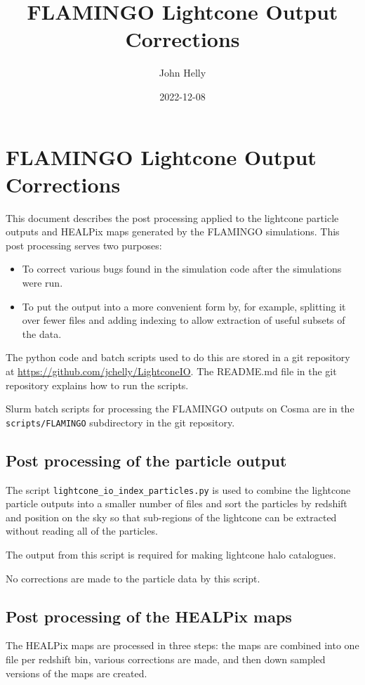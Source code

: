 \documentclass{article}
\title{FLAMINGO Lightcone Output Corrections}
\date{2022-12-08}
\author{John Helly}
\begin{document}
\maketitle

\section{FLAMINGO Lightcone Output Corrections}

This document describes the post processing applied to the lightcone
particle outputs and HEALPix maps generated by the FLAMINGO
simulations. This post processing serves two purposes:
\begin{itemize}
\item{To correct various bugs found in the simulation code after the
    simulations were run.}
\item{To put the output into a more convenient form by, for example,
    splitting it over fewer files and adding indexing to allow
    extraction of useful subsets of the data.}
\end{itemize}
The python code and batch scripts used to do this are stored in a git
repository at \url{https://github.com/jchelly/LightconeIO}. The
README.md file in the git repository explains how to run the scripts.

Slurm batch scripts for processing the FLAMINGO outputs on Cosma are
in the \verb|scripts/FLAMINGO| subdirectory in the git repository.

\subsection{Post processing of the particle output}

The script \verb|lightcone_io_index_particles.py| is used to combine the
lightcone particle outputs into a smaller number of files and sort the
particles by redshift and position on the sky so that sub-regions of
the lightcone can be extracted without reading all of the particles.

The output from this script is required for making lightcone halo
catalogues.

No corrections are made to the particle data by this script.

\subsection{Post processing of the HEALPix maps}

The HEALPix maps are processed in three steps: the maps are combined
into one file per redshift bin, various corrections are made, and then
down sampled versions of the maps are created.
\end{document}
